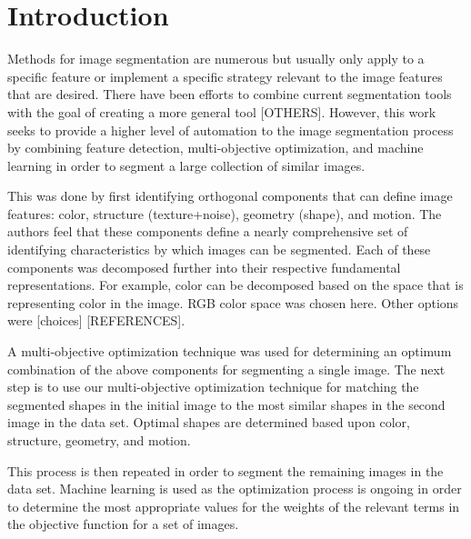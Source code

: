 \section{Introduction}
Methods for image segmentation are numerous but usually only apply to a specific feature or implement a specific strategy relevant to the image features that are desired. There have been efforts to combine current segmentation tools with the goal of creating a more general tool \cite{fergus03} [OTHERS]. However, this work seeks to provide a higher level of automation to the image segmentation process by combining feature detection, multi-objective optimization, and machine learning in order to segment a large collection of similar images.

This was done by first identifying orthogonal components that can define image features: color, structure (texture+noise), geometry (shape), and motion. The authors feel that these components define a nearly comprehensive set of identifying characteristics by which images can be segmented. Each of these components was decomposed further into their respective fundamental representations. For example, color can be decomposed based on the space that is representing color in the image. RGB color space was chosen here. Other options were [choices] [REFERENCES].

A multi-objective optimization technique was used for determining an optimum combination of the above components for segmenting a single image. The next step is to use our multi-objective optimization technique for matching the segmented shapes in the initial image to the most similar shapes in the second image in the data set. Optimal shapes are determined based upon color, structure, geometry, and motion.

This process is then repeated in order to segment the remaining images in the data set. Machine learning is used as the optimization process is ongoing in order to determine the most appropriate values for the weights of the relevant terms in the objective function for a set of images.
